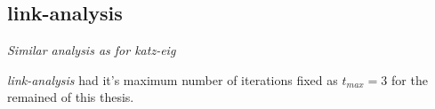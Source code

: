 \newpage


\subsection{link-analysis}


\textit{Similar analysis as for katz-eig}

\textit{link-analysis} had it's maximum number of iterations fixed as $t_{max} = 3$ for the remained of this thesis.





